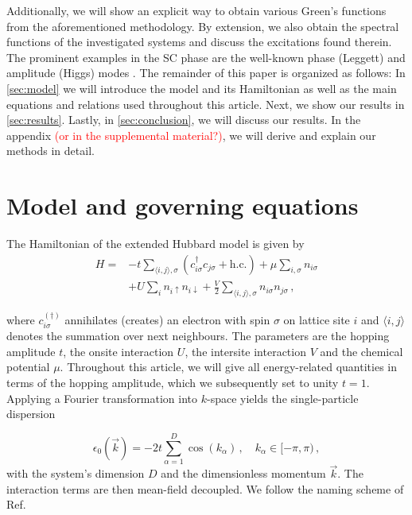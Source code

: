 \documentclass[
    reprint, 
    aps,
    preprintnumbers,
    twocolumn,
    prb,
    superscriptaddress
]{revtex4-2}
\newcommand{\vk}{\vec{k}}
\begin{document}
Additionally, we will show an explicit way to obtain various Green's functions from the aforementioned methodology.
By extension, we also obtain the spectral functions of the investigated systems and discuss the excitations found therein.
The prominent examples in the SC phase are the well-known phase (Leggett) and amplitude (Higgs) modes \cite{Cea14,Krull16,Schwarz20,Fan22}.
\newline
The remainder of this paper is organized as follows:
In \autoref{sec:model} we will introduce the model and its Hamiltonian as well as the main equations and relations used throughout this article.
Next, we show our results in \autoref{sec:results}.
Lastly, in \autoref{sec:conclusion}, we will discuss our results.
In the appendix \textcolor{red}{(or in the supplemental material?)}, we will derive and explain our methods in detail.

\section{Model and governing equations}\label{sec:model}

The Hamiltonian of the extended Hubbard model is given by
\begin{equation}
    \begin{aligned}
        H = &-t \sum_{\langle i, j \rangle, \sigma} \left( c_{i\sigma}^\dagger c_{j\sigma} + \text{h.c.} \right) 
        + \mu \sum_{i,\sigma} n_{i\sigma} \\
        &+ U \sum_{i} n_{i\uparrow} n_{i\downarrow} 
        + \frac{V}{2} \sum_{\langle i, j\rangle, \sigma} n_{i\sigma} n_{j\sigma}\,,
    \end{aligned}
\end{equation}

where $c_{i\sigma}^{(\dagger)}$ annihilates (creates) an electron with spin $\sigma$ on lattice site $i$ and $\langle i, j\rangle$ denotes the summation over next neighbours.
The parameters are the hopping amplitude $t$, the onsite interaction $U$, the intersite interaction $V$ and the chemical potential $\mu$.
Throughout this article, we will give all energy-related quantities in terms of the hopping amplitude, which we subsequently set to unity $t=1$.
Applying a Fourier transformation into $k$-space yields the single-particle dispersion 

\begin{equation}
    \epsilon_0 (\vk) = -2t \sum_{\alpha=1}^D \cos(k_\alpha)\,,\quad k_\alpha \in [-\pi, \pi)\,,
\end{equation}
with the system's dimension $D$ and the dimensionless momentum $\vk$.
The interaction terms are then mean-field decoupled. 
We follow the naming scheme of Ref. \cite{sentef17}
\end{document}
